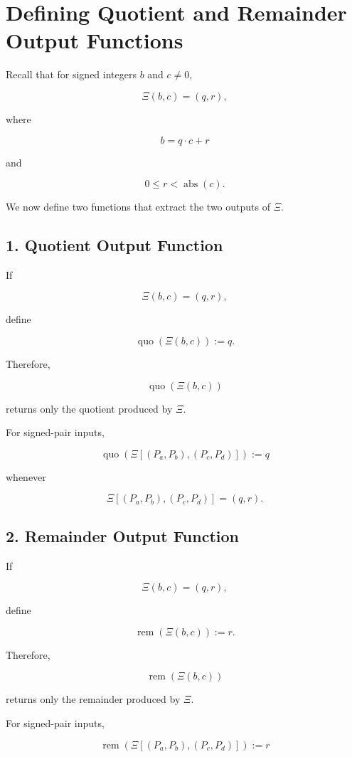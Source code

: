 \documentclass[12pt]{article}
\begin{document}
\section*{Defining Quotient and Remainder Output Functions}

Recall that for signed integers \(b\) and \(c\neq 0\),

\[
\Xi(b,c)=(q,r),
\]

where

\[
b=q\cdot c+r
\]

and

\[
0\leq r<\operatorname{abs}(c).
\]

We now define two functions that extract the two outputs of \(\Xi\).

\subsection*{1. Quotient Output Function}

If

\[
\Xi(b,c)=(q,r),
\]

define

\[
\boxed{
\operatorname{quo}(\Xi(b,c)):=q.
}
\]

Therefore,

\[
\operatorname{quo}
\left(
\Xi(b,c)
\right)
\]

returns only the quotient produced by \(\Xi\).

For signed-pair inputs,

\[
\boxed{
\operatorname{quo}
\left(
\Xi[(P_a,P_b),(P_c,P_d)]
\right)
:=
q
}
\]

whenever

\[
\Xi[(P_a,P_b),(P_c,P_d)]
=
(q,r).
\]

\subsection*{2. Remainder Output Function}

If

\[
\Xi(b,c)=(q,r),
\]

define

\[
\boxed{
\operatorname{rem}(\Xi(b,c)):=r.
}
\]

Therefore,

\[
\operatorname{rem}
\left(
\Xi(b,c)
\right)
\]

returns only the remainder produced by \(\Xi\).

For signed-pair inputs,

\[
\boxed{
\operatorname{rem}
\left(
\Xi[(P_a,P_b),(P_c,P_d)]
\right)
:=
r
}
\]
\end{document}
